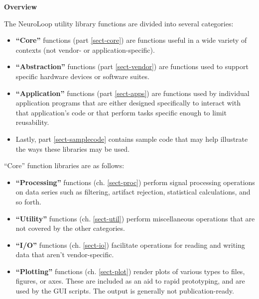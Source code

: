 
\vspace*{0.75in}
{\Huge \bfseries Overview}
\vspace*{\baselineskip}
\label{sect-over}

The NeuroLoop utility library functions are divided into several categories:

\begin{itemize}
%
\item \textbf{``Core''} functions (part \ref{sect-core}) are functions
useful in a wide variety of contexts (not vendor- or application-specific).
%
\item \textbf{``Abstraction''} functions (part \ref{sect-vendor}) are
functions used to support specific hardware devices or software suites.
%
\item \textbf{``Application''} functions (part \ref{sect-apps}) are
functions used by individual application programs that are either designed
specifically to interact with that application's code or that perform
tasks specific enough to limit reusability.
%
\item Lastly, part \ref{sect-samplecode} contains sample code that may
help illustrate the ways these libraries may be used.
%
\end{itemize}

``Core'' function libraries are as follows:

\begin{itemize}
%
\item \textbf{``Processing''} functions (ch. \ref{sect-proc}) perform signal
processing operations on data series such as filtering, artifact rejection,
statistical calculations, and so forth.
%
\item \textbf{``Utility''} functions (ch. \ref{sect-util}) perform
miscellaneous operations that are not covered by the other categories.
%
\item \textbf{``I/O''} functions (ch. \ref{sect-io}) facilitate operations
for reading and writing data that aren't vendor-specific.
%
\item \textbf{``Plotting''} functions (ch. \ref{sect-plot}) render plots
of various types to files, figures, or axes. These are included as an aid
to rapid prototyping, and are used by the GUI scripts. The output is
generally not publication-ready.
%
\end{itemize}

